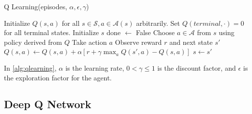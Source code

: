 \documentclass{article}
\begin{document}
\begin{algorithm}[H]
      \caption{Q Learning(episodes, \(\alpha, \epsilon, \gamma\))}
      \label{alg:qlearning}
      \begin{algorithmic}[1]
            \State Initialize \(Q(s,a)\) for all \(s \in \mathcal{S}, a \in \mathcal{A}(s)\) arbitrarily.
            \State Set \(Q(terminal, \cdot) = 0 \) for all terminal states.
            \State Initialize \(s\)
            \State done \(\leftarrow\) False
            \State Choose \(a \in \mathcal{A}\) from \(s\) using policy derived from \(Q\) 
            \State Take action \(a\)
            \State Observe reward \(r\) and next state \(s'\)
            \State \(Q(s, a) \leftarrow Q(s, a) + \alpha \left[r + \gamma \max_{a} Q(s', a) - Q(s, a)\right]\) 
            \State \(s \leftarrow s'\)
            \EndWhile
            \EndFor
      \end{algorithmic}
\end{algorithm}

In \cref{alg:qlearning}, \(\alpha\) is the learning rate, \(0 < \gamma \leq 1\)
is the discount factor, and \(\epsilon\) is the exploration factor for the
agent.

\subsection{Deep Q Network}
\end{document}
